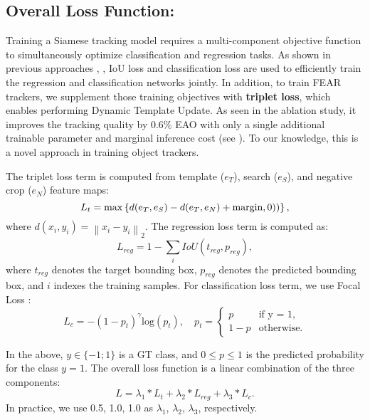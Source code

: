 \documentclass[runningheads]{llncs}
\begin{document}
\subsection{Overall Loss Function:} Training a Siamese tracking model requires a multi-component objective function to simultaneously optimize classification and regression tasks. 
As shown in previous approaches \cite{Ocean}, \cite{STARK}, IoU loss \cite{IoUloss} and classification loss are used to efficiently train the regression and classification networks jointly. In addition, to train FEAR trackers, we supplement those training objectives with \textbf{triplet loss}, which enables performing Dynamic Template Update. As seen in the ablation study, it improves the tracking quality by $0.6\%$ EAO with only a single additional trainable parameter and marginal inference cost (see ). To our knowledge, this is a novel approach in training object trackers.

The triplet loss term is computed from template ($e_T$), search ($e_S$), and negative crop ($e_N$) feature maps:
 \begin{equation} \label{eq2}
L_t = \max\left \{ d(e_T, e_S) -d(e_T, e_N) + \textnormal{margin}, 0)) \right \},
\end{equation}
where $d(x_i, y_i) = \left \| x_i-y_i \right \|_2$.
The regression loss term is computed as:
 \begin{equation} \label{eq4}
L_{reg} = 1 -\sum_i IoU(t_{reg}, p_{reg}),
\end{equation}
where $t_{reg}$ denotes the target bounding box, $p_{reg}$ denotes the predicted bounding box, and $i$ indexes the training samples.
For classification loss term, we use Focal Loss \cite{FocalLoss}:
 \begin{equation} \label{eq5}
L_c = -(1 - p_t)^\gamma \mathrm{log}(p_t),
\quad
p_t =
    \begin{cases}
      p & \text{if y = 1,}\\
      1 - p & \text{otherwise.}
    \end{cases}
\end{equation}

In the above, $y \in \{-1; 1\}$ is a GT class, and $0 \le p \le 1$ is the predicted probability for the class $y=1$.
The overall loss function is a linear combination of the three components:
 \begin{equation} \label{eq6}
L = \lambda_1 * L_t + \lambda_2 * L_{reg} + \lambda_3 * L_c.
\end{equation}
In practice, we use 0.5, 1.0, 1.0 as $\lambda_1$, $\lambda_2$, $\lambda_3$, respectively. 
\end{document}
